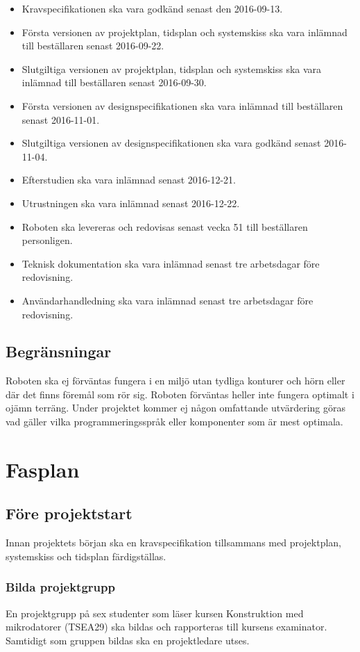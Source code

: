 \documentclass{article}
\begin{document}
\begin{itemize}
    \item Kravspecifikationen ska vara godkänd senast den 2016-09-13.
    \item Första versionen av projektplan, tidsplan och systemskiss ska vara inlämnad till beställaren senast 2016-09-22.
    \item Slutgiltiga versionen av projektplan, tidsplan och systemskiss ska vara inlämnad till beställaren senast 2016-09-30.
    \item Första versionen av designspecifikationen ska vara inlämnad till beställaren senast 2016-11-01.
    \item Slutgiltiga versionen av designspecifikationen ska vara godkänd senast 2016-11-04.
    \item Efterstudien ska vara inlämnad senast 2016-12-21.
    \item Utrustningen ska vara inlämnad senast 2016-12-22.
    \item Roboten ska levereras och redovisas senast vecka 51 till beställaren personligen.
    \item Teknisk dokumentation ska vara inlämnad senast tre arbetsdagar före redovisning.
    \item Användarhandledning ska vara inlämnad senast tre arbetsdagar före redovisning.
\end{itemize}


\subsection{Begränsningar}
Roboten ska ej förväntas fungera i en miljö utan tydliga konturer och hörn eller där det finns föremål som rör sig. Roboten förväntas heller inte fungera optimalt i ojämn terräng. Under projektet kommer ej någon omfattande utvärdering göras vad gäller vilka programmeringsspråk eller komponenter som är mest optimala.

\section{Fasplan}

\subsection{Före projektstart}
Innan projektets början ska en kravspecifikation tillsammans med projektplan, systemskiss och tidsplan färdigställas.

\subsubsection{Bilda projektgrupp}
En projektgrupp på sex studenter som läser kursen Konstruktion med mikrodatorer (TSEA29) ska bildas och rapporteras till kursens examinator. Samtidigt som gruppen bildas ska en projektledare utses.
\end{document}
